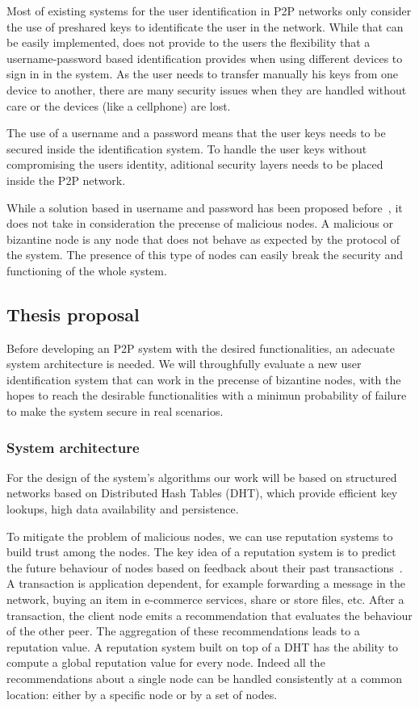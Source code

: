 \documentclass[12pt,spanish]{article}
\begin{document}
Most of existing systems for the user identification in P2P networks only consider the
use of preshared keys to identificate the user in the network. While that can
be easily implemented, does not provide to the users the flexibility that a
username-password based identification provides when using different devices to
sign in in the system. As the user needs to transfer manually his keys from one
device to another, there are many security issues when they are handled without
care or the devices (like a cellphone) are lost. 

The use of a username and a password means that the user keys needs to be secured inside the identification system.
To handle the user keys without compromising the users identity, aditional
security layers needs to be placed inside the P2P network.

While a solution based in username and password has been proposed
before~\cite{kreitz2012passwords}, it does not take in consideration the
precense of malicious nodes. A malicious or bizantine node is any node that does
not behave as expected by the protocol of the system. The presence of this type
of nodes can easily break the security and functioning of the whole system.


\subsection{Thesis proposal}

Before developing an P2P system with the desired functionalities, an adecuate
system architecture is needed. We will throughfully evaluate a new user
identification system that can work in the precense of bizantine nodes, with
the hopes to reach the desirable functionalities with a minimun probability of
failure to make the system secure in real scenarios.

\subsubsection{System architecture}

For the design of the system's algorithms our work will be based on structured
networks based on Distributed Hash Tables (DHT), which provide efficient key
lookups, high data availability and persistence.

To mitigate the problem of malicious nodes, we can use reputation systems to
build trust among the nodes. The key
idea of a reputation system is to predict the future behaviour
of nodes based on feedback about their past
transactions~\cite{Resnick:2000:RS:355112.355122}. A
transaction is application dependent, for example forwarding a
message in the network, buying an item in e-commerce services,
share or store files, etc. After a transaction, the client node emits
a recommendation that evaluates the behaviour of the other peer.
The aggregation of these recommendations leads to a reputation
value.
A reputation system built on top of a DHT has the ability
to compute a global reputation value for every node. Indeed
all the recommendations about a single node can be handled
consistently at a common location: either by a specific node
or by a set of nodes.
\end{document}
